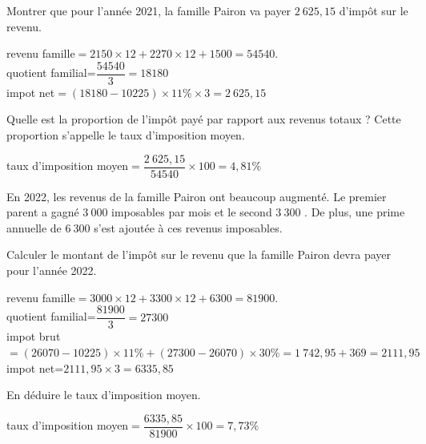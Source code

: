 \documentclass[11pt,a4paper]{article}  %
\begin{document}
\begin{enumMet}
	\item \begin{enumMet}
		\item Montrer que pour l'année 2021, la famille Pairon va payer $2\ 625,15$ \EUR{} d'impôt sur le revenu.
		\begin{corrBox}
			revenu famille$=2150\times 12+2270\times 12+1500=54540$.\\
			quotient familial=$\dfrac{54540}{3}=18180$\\
			impot net$=(18180-10225)\times 11\%\times 3=2\ 625,15$	
		\end{corrBox}
		\item Quelle est la proportion de l'impôt payé par rapport aux revenus totaux ? Cette proportion s'appelle le taux d'imposition moyen.
		\begin{corrBox}
			taux d'imposition moyen$=\dfrac{2\ 625,15}{54540}\times 100=4,81\%$	
		\end{corrBox}
	\end{enumMet}
	\item En 2022, les revenus de la famille Pairon ont beaucoup augmenté. Le premier parent a gagné $3\ 000$ \EUR{} imposables par mois et le second $3\ 300$ \EUR{}. De plus, une prime annuelle de $6\ 300$ \EUR{} s'est ajoutée à ces revenus imposables.
	\begin{enumMet}
		\item Calculer le montant de l'impôt sur le revenu que la famille Pairon devra payer pour l'année 2022.
		\begin{corrBox}
			revenu famille$=3000\times 12+3300\times 12+6300=81900$.\\
			quotient familial=$\dfrac{81900}{3}=27300$\\
			impot brut$=(26070-10225)\times 11\%+(27300-26070)\times 30\%=1\ 742,95+369=2111,95$\\
			impot net=$2111,95\times 3=6335,85$	
		\end{corrBox}
		\item En déduire le taux d'imposition moyen.
		\begin{corrBox}
			taux d'imposition moyen$=\dfrac{6335,85}{81900}\times 100=7,73\%$	
		\end{corrBox}
	\end{enumMet}
\end{enumMet}
\end{document}
